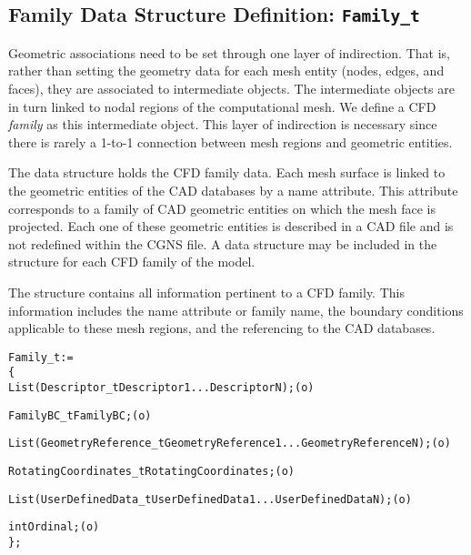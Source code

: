 \subsection{Family Data Structure Definition: \texttt{Family\_t}}
\label{s:Family}

Geometric associations need to be set through one layer of indirection.
That is, rather than setting the geometry data for each mesh entity
(nodes, edges, and faces), they are associated to intermediate objects.
The intermediate objects are in turn linked to nodal regions of the
computational mesh.
We define a CFD \emph{family} as this intermediate object.
This layer of indirection is necessary since there is rarely a 1-to-1
connection between mesh regions and geometric entities.

The  data structure holds the CFD family data.
Each mesh surface is linked to the geometric entities of the CAD databases
by a name attribute.
This attribute corresponds to a family of CAD geometric entities on which
the mesh face is projected.
Each one of these geometric entities is described in a CAD file and is not
redefined within the CGNS file.
A  data structure may be included in the 
structure for each CFD family of the model.

The  structure contains all information pertinent to a
CFD family.
This information includes the name attribute or family name, the
boundary conditions applicable to these mesh regions, and the referencing
to the CAD databases.

\begin{alltt}
  Family\_t :=
    \{
    List( Descriptor\_t Descriptor1 ... DescriptorN ) ;                      (o)

    FamilyBC\_t FamilyBC ;                                                   (o)

    List( GeometryReference\_t GeometryReference1 ... GeometryReferenceN ) ; (o)

    RotatingCoordinates\_t RotatingCoordinates ;                             (o)

    List( UserDefinedData\_t UserDefinedData1 ... UserDefinedDataN ) ;       (o)

    int Ordinal ;                                                           (o)
    \} ;
\end{alltt}


